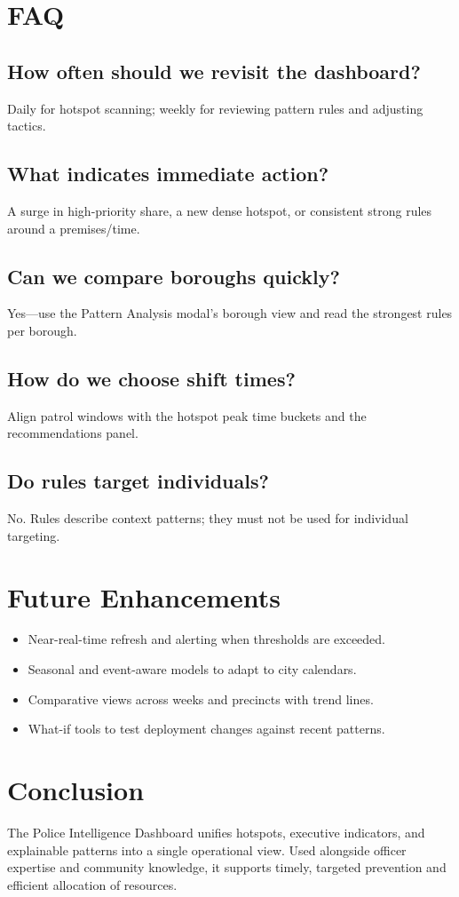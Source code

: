 \documentclass[11pt]{article}
\begin{document}
\section{FAQ}

\subsection*{How often should we revisit the dashboard?}
Daily for hotspot scanning; weekly for reviewing pattern rules and adjusting tactics.

\subsection*{What indicates immediate action?}
A surge in high-priority share, a new dense hotspot, or consistent strong rules around a premises/time.

\subsection*{Can we compare boroughs quickly?}
Yes---use the Pattern Analysis modal's borough view and read the strongest rules per borough.

\subsection*{How do we choose shift times?}
Align patrol windows with the hotspot peak time buckets and the recommendations panel.

\subsection*{Do rules target individuals?}
No. Rules describe context patterns; they must not be used for individual targeting.

\section{Future Enhancements}
\begin{itemize}[leftmargin=*]
  \item Near-real-time refresh and alerting when thresholds are exceeded.
  \item Seasonal and event-aware models to adapt to city calendars.
  \item Comparative views across weeks and precincts with trend lines.
  \item What-if tools to test deployment changes against recent patterns.
\end{itemize}

\section{Conclusion}
The Police Intelligence Dashboard unifies hotspots, executive indicators, and explainable patterns into a single operational view. Used alongside officer expertise and community knowledge, it supports timely, targeted prevention and efficient allocation of resources.
\end{document}
